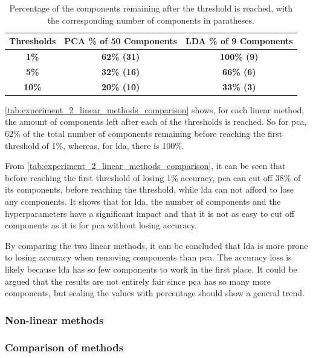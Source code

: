 \begin{table}[htb!]
    \centering
    \begin{tabular}{|c|c|c|}
        \hline
        \textbf{Thresholds} & \textbf{PCA \% of 50 Components} & \textbf{LDA \% of 9 Components} \\ \hline
        \textbf{1\%} & \textbf{62\% (31)} & \textbf{100\% (9)} \\ \hline
        \textbf{5\%} & \textbf{32\% (16)} & \textbf{66\% (6)} \\ \hline
        \textbf{10\%} & \textbf{20\% (10)} & \textbf{33\% (3)} \\
        \hline
    \end{tabular}
    \caption{Percentage of the components remaining after the threshold is reached, with the corresponding number of components in paratheses.}
    \label{tab:experiment_2_linear_methods_comparison}
\end{table}

\autoref{tab:experiment_2_linear_methods_comparison} shows, for each linear method, the amount of components left after each of the thresholds is reached. So for \gls{pca}, 62\% of the total number of components remaining before reaching the first threshold of 1\%, whereas, for \gls{lda}, there is 100\%.

From \autoref{tab:experiment_2_linear_methods_comparison}, it can be seen that before reaching the first threshold of losing 1\% accuracy, \gls{pca} can cut off 38\% of its components, before reaching the threshold, while \gls{lda} can not afford to lose any components. It shows that for \gls{lda}, the number of components and the hyperparameters have a significant impact and that it is not as easy to cut off components as it is for \gls{pca} without losing accuracy.

By comparing the two linear methods, it can be concluded that \gls{lda} is more prone to losing accuracy when removing components than \gls{pca}. The accuracy loss is likely because \gls{lda} has so few components to work in the first place. It could be argued that the results are not entirely fair since \gls{pca} has so many more components, but scaling the values with percentage should show a general trend.


\subsubsection{Non-linear methods}

\subsubsection{Comparison of methods}




